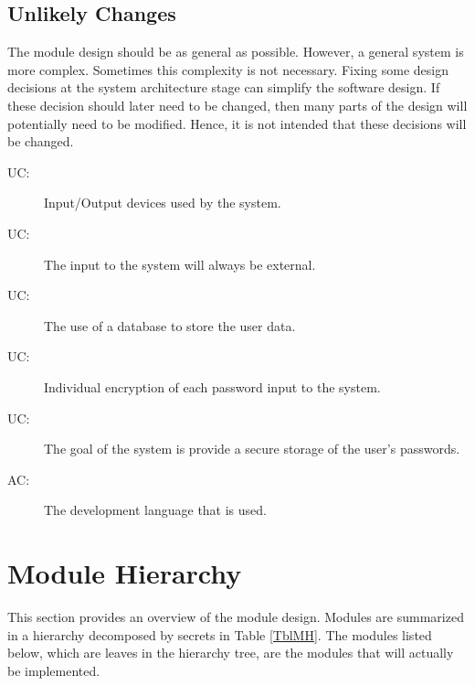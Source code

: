 \documentclass[12pt, titlepage]{article}
\newcounter{acnum}
\newcommand{\actheacnum}{AC\theacnum}
\newcounter{ucnum}
\newcommand{\uctheucnum}{UC\theucnum}
\begin{document}
\subsection{Unlikely Changes} \label{SecUchange}

The module design should be as general as possible. However, a general system is
more complex. Sometimes this complexity is not necessary. Fixing some design
decisions at the system architecture stage can simplify the software design. If
these decision should later need to be changed, then many parts of the design
will potentially need to be modified. Hence, it is not intended that these
decisions will be changed.

\begin{description}
  \item[ \uctheucnum \label{ucIO}:] Input/Output devices
  used by the system.
  \item[ \uctheucnum \label{ucInput}:] The input to the 
  system will always be external.
  \item[ \uctheucnum \label{ucDBase}:] The use of a database to store the user data.
  \item[ \uctheucnum \label{ucPassEncrypt}:] Individual encryption of each password input to the system.
  \item[ \uctheucnum \label{ucPurpose}:] The goal of the system is provide a secure storage of the user's passwords.
  \item[ \actheacnum \label{ucLanguage}:] The development language that is used.

\end{description}

\section{Module Hierarchy} \label{SecMH}

This section provides an overview of the module design. Modules are summarized
in a hierarchy decomposed by secrets in Table \ref{TblMH}. The modules listed
below, which are leaves in the hierarchy tree, are the modules that will
actually be implemented.
\end{document}
